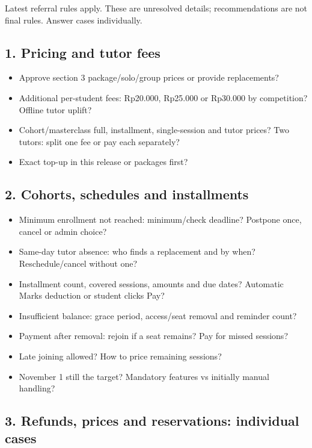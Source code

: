 \documentclass[11pt,a4paper]{article}
\begin{document}
Latest referral rules apply. These are unresolved details; recommendations are not final rules. Answer cases individually.

\subsection*{1. Pricing and tutor fees}

\begin{itemize}
\item Approve section 3 package/\allowbreak{}solo/\allowbreak{}group prices or provide replacements?
\item Additional per-student fees: Rp20.000, Rp25.000 or Rp30.000 by competition? Offline tutor uplift?
\item Cohort/\allowbreak{}masterclass full, installment, single-session and tutor prices? Two tutors: split one fee or pay each separately?
\item Exact top-up in this release or packages first?
\end{itemize}

\subsection*{2. Cohorts, schedules and installments}

\begin{itemize}
\item Minimum enrollment not reached: minimum/\allowbreak{}check deadline? Postpone once, cancel or admin choice?
\item Same-day tutor absence: who finds a replacement and by when? Reschedule/\allowbreak{}cancel without one?
\item Installment count, covered sessions, amounts and due dates? Automatic Marks deduction or student clicks Pay?
\item Insufficient balance: grace period, access/\allowbreak{}seat removal and reminder count?
\item Payment after removal: rejoin if a seat remains? Pay for missed sessions?
\item Late joining allowed? How to price remaining sessions?
\item November 1 still the target? Mandatory features vs initially manual handling?
\end{itemize}

\subsection*{3. Refunds, prices and reservations: individual cases}
\end{document}

